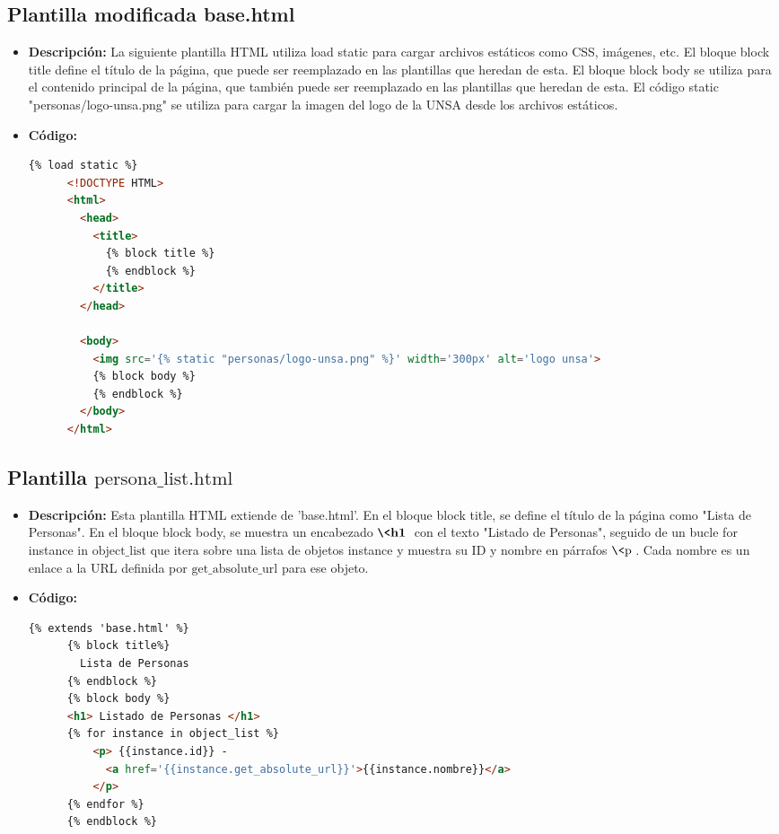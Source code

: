 \documentclass{article}
\begin{document}

  \subsection{Plantilla modificada base.html}
  \begin{itemize}
    \item \textbf{Descripción: }La siguiente plantilla HTML utiliza load static para cargar archivos estáticos como CSS, 
    imágenes, etc. El bloque block title define el título de la página, que puede ser reemplazado en las plantillas que 
    heredan de esta. El bloque block body se utiliza para el contenido principal de la página, que también puede ser 
    reemplazado en las plantillas que heredan de esta. El código static "personas/logo-unsa.png" se utiliza para cargar 
    la imagen del logo de la UNSA desde los archivos estáticos.
    \item \textbf{Código: }
    \begin{lstlisting}[language=html]
      {% load static %}
      <!DOCTYPE HTML>
      <html>
        <head>
          <title>
            {% block title %}
            {% endblock %}
          </title>
        </head>
        
        <body>
          <img src='{% static "personas/logo-unsa.png" %}' width='300px' alt='logo unsa'> 
          {% block body %}
          {% endblock %}
        </body>
      </html>
    \end{lstlisting}   
  \end{itemize}
  

  \subsection{Plantilla $\text{persona\_list.html}$}
  \begin{itemize}
    \item \textbf{Descripción: }Esta plantilla HTML extiende de 'base.html'. En el bloque block title, 
    se define el título de la página como "Lista de Personas". En el bloque block body, se muestra un encabezado 
    $\textbf{\<h1\>}$ con el texto "Listado de Personas", seguido de un bucle for instance in $\text{object\_list}$ que 
    itera sobre una lista de objetos instance y muestra su ID y nombre en párrafos $\text{\<p\>}$. Cada nombre es un enlace a la URL 
    definida por $\text{get\_absolute\_url}$ para ese objeto.
    \item \textbf{Código: }
    \begin{lstlisting}[language=html]
      {% extends 'base.html' %}
      {% block title%}
        Lista de Personas
      {% endblock %}
      {% block body %}
      <h1> Listado de Personas </h1>
      {% for instance in object_list %}
          <p> {{instance.id}} - 
            <a href='{{instance.get_absolute_url}}'>{{instance.nombre}}</a>
          </p>
      {% endfor %}
      {% endblock %}
    \end{lstlisting}   
  \end{itemize}
  
\end{document}

